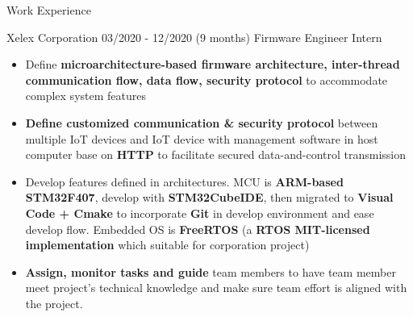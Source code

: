 \documentclass{resume} %
\begin{document}
\begin{rSection}{Work Experience}
\begin{rCompanySubsection}
    {Xelex Corporation}
    {03/2020 - 12/2020 (9 months)}
    {Firmware Engineer Intern}
    {}
\begin{itemize}
     \item Define {\bf microarchitecture-based firmware architecture, inter-thread communication flow, data flow, security protocol} to accommodate complex system features
     \item \textbf{Define customized communication \& security protocol} between multiple IoT devices and IoT device with management software in host computer base on \textbf{HTTP} to facilitate secured data-and-control transmission
     \item Develop features defined in architectures. MCU is {\bf ARM-based STM32F407}, develop with {\bf STM32CubeIDE}, then migrated to {\bf Visual Code + Cmake} to incorporate {\bf Git} in develop environment and ease develop flow. Embedded OS is {\bf FreeRTOS} (a  {\bf RTOS MIT-licensed implementation} which suitable for corporation project)
     \item {\bf Assign, monitor tasks and guide} team members to have team member meet project's technical knowledge and make sure team effort is aligned with the project.

\end{itemize}
\end{rCompanySubsection}




\end{rSection}
\end{document}
